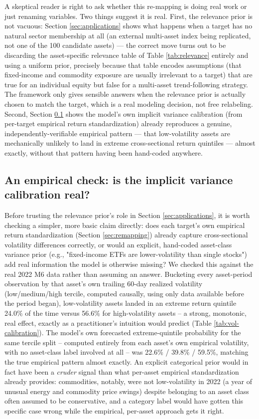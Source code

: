 \documentclass[11pt]{article}
\begin{document}
A skeptical reader is right to ask whether this re-mapping is doing real work
or just renaming variables. Two things suggest it is real. First, the
relevance prior is not vacuous: Section \ref{sec:applications} shows what
happens when a target has no natural sector membership at all (an external
multi-asset index being replicated, not one of the 100 candidate assets) ---
the correct move turns out to be discarding the asset-specific relevance table
of Table \ref{tab:relevance} entirely and using a uniform prior, precisely
because that table encodes assumptions (that fixed-income and commodity
exposure are usually irrelevant to a target) that are true for an individual
equity but false for a multi-asset trend-following strategy. The framework
only gives sensible answers when the relevance prior is actually chosen to
match the target, which is a real modeling decision, not free relabeling.
Second, Section \ref{sec:vol-calibration} shows the model's own implicit
variance calibration (from per-target empirical return standardization)
already reproduces a genuine, independently-verifiable empirical pattern ---
that low-volatility assets are mechanically unlikely to land in extreme
cross-sectional return quintiles --- almost exactly, without that pattern
having been hand-coded anywhere.

\subsection{An empirical check: is the implicit variance calibration real?}
\label{sec:vol-calibration}

Before trusting the relevance prior's role in Section \ref{sec:applications},
it is worth checking a simpler, more basic claim directly: does each target's
own empirical return standardization (Section \ref{sec:remapping}) already
capture cross-sectional volatility differences correctly, or would an
explicit, hand-coded asset-class variance prior (e.g., "fixed-income ETFs are
lower-volatility than single stocks") add real information the model is
otherwise missing? We checked this against the real 2022 M6 data rather than
assuming an answer. Bucketing every asset-period observation by that asset's
own trailing 60-day realized volatility (low/medium/high tercile, computed
causally, using only data available before the period began), low-volatility
assets landed in an extreme return quintile 24.0\% of the time versus 56.6\%
for high-volatility assets -- a strong, monotonic, real effect, exactly as a
practitioner's intuition would predict (Table \ref{tab:vol-calibration}). The
model's own forecasted extreme-quintile probability for the same tercile split
-- computed entirely from each asset's own empirical volatility, with no
asset-class label involved at all -- was 22.6\% / 39.8\% / 59.5\%, matching
the true empirical pattern almost exactly. An explicit categorical prior would
in fact have been a \emph{cruder} signal than what per-asset empirical
standardization already provides: commodities, notably, were not low-volatility
in 2022 (a year of unusual energy and commodity price swings) despite
belonging to an asset class often assumed to be conservative, and a category
label would have gotten this specific case wrong while the empirical,
per-asset approach gets it right.
\end{document}
